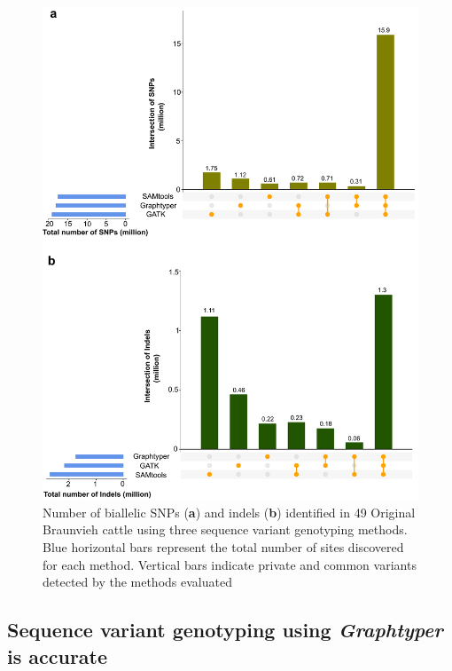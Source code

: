 \documentclass[../main.tex]{subfiles}
\begin{document}
\newpage
\begin{figure}[!htb]
    \centering
    \includegraphics[width=\textwidth]{paper1/main_figure/Figure2.pdf}
    \caption[Number of biallelic variants]{Number of biallelic SNPs (\textbf{a}) and indels (\textbf{b}) identified in 49 Original Braunvieh cattle using three sequence variant genotyping methods. Blue horizontal bars represent the total number of sites discovered for each method. Vertical bars indicate private and common variants detected by the methods evaluated}
    \label{fig:varoverlap}
\end{figure}

\newpage

\subsection*{Sequence variant genotyping using \emph{Graphtyper} is accurate}
\end{document}
